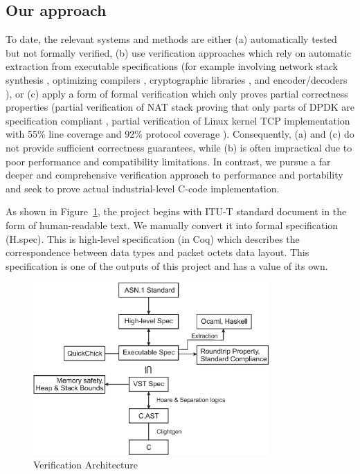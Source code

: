 \documentclass[10p,conference]{IEEEtran}
\begin{document}
\subsection{Our approach}
\label{sec:approach}
To date, the relevant systems and methods are either (a) automatically tested but not
formally verified, (b) use verification approaches which rely on
automatic extraction from executable specifications (for example
involving network stack synthesis \cite{SEL4}, optimizing compilers
\cite{CompCert}, cryptographic libraries \cite{HACL}, and
encoder/decoders \cite{Narcissus}), or (c) apply a form of formal
verification which only proves partial correctness properties (partial
verification of NAT stack proving that only parts of DPDK are specification
compliant \cite{NAT}, partial verification of Linux kernel TCP
implementation with 55\% line coverage and 92\% protocol coverage
\cite{NSDI}). Consequently, (a) and (c) do not provide sufficient
correctness guarantees, while (b) is often impractical due to poor
performance and compatibility limitations. In contrast, we pursue a
far deeper and comprehensive verification approach to performance and
portability and seek to prove actual industrial-level C-code
implementation.

As shown in Figure~\ref{fig:components}, the project begins with ITU-T
standard document in the form of human-readable text. We manually
convert it into formal specification (H.spec). This is high-level
specification (in Coq) which describes the correspondence between data
types and packet octets data layout. This
specification is one of the outputs of this project and has a value of
its own.

\begin{figure}[h!]
  \centering
  \includegraphics[width=9cm]{VerificationArchitectureDiagram.eps}
  \caption{Verification Architecture}
  \label{fig:components}
\end{figure}
\end{document}
